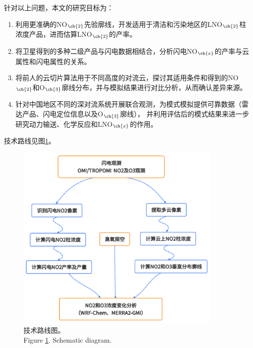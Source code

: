 针对以上问题，本文的研究目标为：

\begin{enumerate}[label=（\arabic*）, labelindent=\parindent, nosep, leftmargin=0pt, widest=0, itemindent=*, topsep=0pt, partopsep=0pt, parsep=0pt]

\item 利用更准确的NO$_{\ch{2}}$先验廓线，开发适用于清洁和污染地区的LNO$_{\ch{2}}$柱浓度产品，进而估算LNO$_{\ch{2}}$的产率。

\item 将卫星得到的多种二级产品与闪电数据相结合，分析闪电NO$_{\ch{x}}$的产率与云属性和闪电属性的关系。

\item 将前人的云切片算法用于不同高度的对流云，探讨其适用条件和得到的NO$_{\ch{2}}$和O$_{\ch{3}}$廓线分布，并与模拟结果进行对比分析，从而确认差异来源。

\item 针对中国地区不同的深对流系统开展联合观测，为模式模拟提供可靠数据（雷达产品、闪电定位信息以及O$_{\ch{3}}$廓线），
并利用评估后的模式结果来进一步研究动力输送、化学反应和LNO$_{\ch{x}}$的作用。

\end{enumerate}


技术路线见图\ref{figure:schematic_diagram}。

\begin{figure}[H]
\centering
\includegraphics[width=0.9\textwidth]{./figures/schematic_diagram.png}
\caption{技术路线图。\\
Figure \ref{figure:schematic_diagram}. Schematic diagram.
}
\label{figure:schematic_diagram}
\end{figure}

